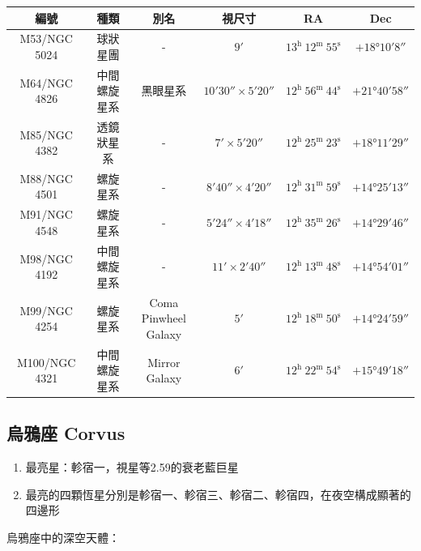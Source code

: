 \begin{center}
\begin{longtable}{c | c | c | c | c | c}
    編號 & 種類 & 別名 & 視尺寸 & RA & Dec \\
    \hline
    \endfirsthead


    \endfoot

    \endlastfoot

    M53/NGC 5024 & 球狀星團 & - & \(\ang{;9;}\) & \(13^\text{h }12^\text{m }55^\text{s}\) & \(+\ang{18;10;8}\) \\
    M64/NGC 4826 & 中間螺旋星系 & 黑眼星系 & \(\ang{;10;30}\times\ang{;5;20}\) & \(12^\text{h }56^\text{m }44^\text{s}\) & \(+\ang{21;40;58}\) \\
    M85/NGC 4382 & 透鏡狀星系 & - & \(\ang{;7;}\times\ang{;5;20}\) & \(12^\text{h }25^\text{m }23^\text{s}\) & \(+\ang{18;11;29}\) \\
    M88/NGC 4501 & 螺旋星系 & - & \(\ang{;8;40}\times\ang{;4;20}\) & \(12^\text{h }31^\text{m }59^\text{s}\) & \(+\ang{14;25;13}\) \\
    M91/NGC 4548 & 螺旋星系 & - & \(\ang{;5;24}\times\ang{;4;18}\) & \(12^\text{h }35^\text{m }26^\text{s}\) & \(+\ang{14;29;46}\) \\
    M98/NGC 4192 & 中間螺旋星系 & - & \(\ang{;11;}\times\ang{;2;40}\) & \(12^\text{h }13^\text{m }48^\text{s}\) & \(+\ang{14;54;01}\) \\
    M99/NGC 4254 & 螺旋星系 & \makecell{Coma Pinwheel\\Galaxy} & \(\ang{;5;}\) & \(12^\text{h }18^\text{m }50^\text{s}\) & \(+\ang{14;24;59}\) \\
    M100/NGC 4321 & 中間螺旋星系 & Mirror Galaxy & \(\ang{;6;}\) & \(12^\text{h }22^\text{m }54^\text{s}\) & \(+\ang{15;49;18}\) \\
\end{longtable}
\end{center}

\subsection{烏鴉座 Corvus}
\begin{enumerate}
    \item 最亮星：軫宿一，視星等2.59的衰老藍巨星
    \item 最亮的四顆恆星分別是軫宿一、軫宿三、軫宿二、軫宿四，在夜空構成顯著的四邊形
\end{enumerate}
烏鴉座中的深空天體：

